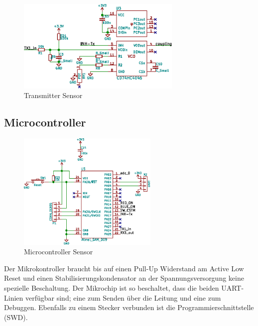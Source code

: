 \begin{figure}[h!t]
    \centering
    \includegraphics[width=0.70\textwidth]{images/sensor-sch/sensor--sch--transmitter.eps}
    \caption[Sensor: Schema Transmitter]{Transmitter Sensor}
\end{figure}


\subsection{Microcontroller}
\label{subsec:hw:sensor:mcu}

\begin{figure}
    \centering
    \includegraphics[width=0.60\textwidth]{images/sensor-sch/sensor--sch--mcu.eps}
    \caption[Sensor: Schema Microcontroller]{Microcontroller Sensor}
\end{figure}

Der  Mikrokontroller  braucht  bis  auf  einen  Pull-Up Widerstand  am  Active
Low  Reset und  einen  Stabilisierungskondensator  an der  Spannungsversorgung
keine  spezielle  Beschaltung. Der  Mikrochip  ist  so  beschaltet,  dass  die
beiden  UART-Linien  verf\"ugbar sind;  eine  zum  Senden \"uber  die  Leitung
und  eine  zum   Debuggen. Ebenfalls  zu  einem  Stecker   verbunden  ist  die
Programmierschnittstelle (SWD).




